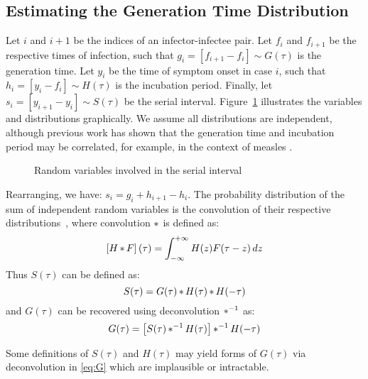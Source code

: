 \subsection{Estimating the Generation Time Distribution}
Let $i$ and $i+1$ be the indices of an infector-infectee pair.
Let $f_i$ and $f_{i+1}$ be the respective times of infection,
such that $g_i = [f_{i+1} - f_i] \sim G(\tau)$ is the generation time.
Let $y_i$ be the time of symptom onset in case $i$,
such that $h_i = [y_i - f_i] \sim H(\tau)$ is the incubation period.
Finally, let $s_i = [y_{i+1} - y_i] \sim S(\tau)$ be the serial interval.
Figure~\ref{fig:nodes} illustrates the variables and distributions graphically.
We assume all distributions are independent,
although previous work has shown that
the generation time and incubation period may be correlated,
for example, in the context of measles \cite{Klinkenberg2011}.
\par
\begin{figure}
  \centering
  
  \caption{Random variables involved in the serial interval}
  \label{fig:nodes}
\end{figure}
\par
Rearranging, we have:
$s_i = g_i + h_{i+1} - h_i$.
The probability distribution of
the sum of independent random variables
is the convolution of their respective distributions~\cite{Hogg2005},  %
where convolution $\mathop{\ast}$ is defined as:
\begin{equation}\label{eq:conv}
  \left[H \mathop{\ast} F\right](\tau) = \int_{-\infty}^{+\infty} H(z) F(\tau - z) \,dz
\end{equation}
Thus $S(\tau)$ can be defined as:
\begin{equation}\label{eq:S}
  S(\tau) = G(\tau) \mathop{\ast} H(\tau) \mathop{\ast} H(-\tau)
\end{equation}
and $G(\tau)$ can be recovered using deconvolution $\mathop{\ast^{-1}}$ as:
\begin{equation}\label{eq:G}
  G(\tau) = \left[S(\tau) \mathop{\ast^{-1}} H(\tau)\right] \mathop{\ast^{-1}} H(-\tau)
\end{equation}
\par
Some definitions of $S(\tau)$ and $H(\tau)$
may yield forms of $G(\tau)$ via deconvolution in \eqref{eq:G}
which are implausible or intractable.
